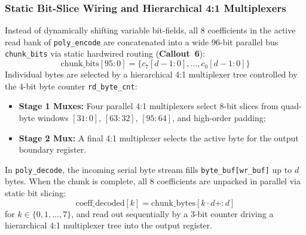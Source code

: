 \subsubsection{Static Bit-Slice Wiring and Hierarchical 4:1 Multiplexers}
Instead of dynamically shifting variable bit-fields, all 8 coefficients in the active read bank of \texttt{poly\_encode} are concatenated into a wide 96-bit parallel bus \texttt{chunk\_bits} via static hardwired routing (\textbf{Callout~6}):
\begin{equation}
\label{eq:codec_chunk_bits_concat}
\text{chunk\_bits}[95:0] = \{c_7[d-1:0], \dots, c_0[d-1:0]\}
\end{equation}
Individual bytes are selected by a hierarchical 4:1 multiplexer tree controlled by the 4-bit byte counter \texttt{rd\_byte\_cnt}:
\begin{itemize}
    \item \textbf{Stage 1 Muxes:} Four parallel 4:1 multiplexers select 8-bit slices from quad-byte windows $[31:0]$, $[63:32]$, $[95:64]$, and high-order padding;
    \item \textbf{Stage 2 Mux:} A final 4:1 multiplexer selects the active byte for the output boundary register.
\end{itemize}

In \texttt{poly\_decode}, the incoming serial byte stream fills \texttt{byte\_buf[wr\_buf]} up to $d$ bytes. When the chunk is complete, all 8 coefficients are unpacked in parallel via static bit slicing:
\begin{equation}
\label{eq:codec_coeff_decoded_slices}
\text{coeff\_decoded}[k] = \text{chunk\_bytes}[k \cdot d +: d]
\end{equation}
for $k \in \{0, 1, \dots, 7\}$, and read out sequentially by a 3-bit counter driving a hierarchical 4:1 multiplexer tree into the output register.

